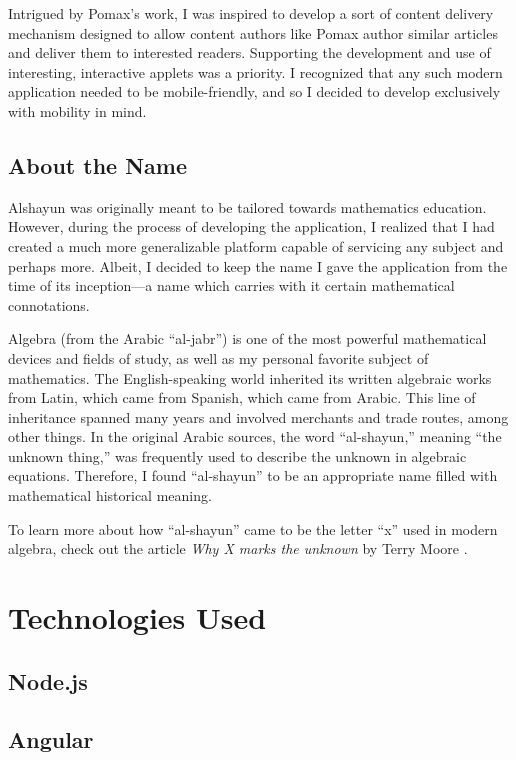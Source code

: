 \documentclass[12pt]{report}
\begin{document}
Intrigued by Pomax's work, I was inspired to develop a sort of content delivery
mechanism designed to allow content authors like Pomax author similar articles
and deliver them to interested readers. Supporting the development and use of
interesting, interactive applets was a priority. I recognized that any such
modern application needed to be mobile-friendly, and so I decided to develop
exclusively with mobility in mind.

    \section{About the Name}

Alshayun was originally meant to be tailored towards mathematics education.
However, during the process of developing the application, I realized that I had
created a much more generalizable platform capable of servicing any subject and
perhaps more. Albeit, I decided to keep the name I gave the application from the
time of its inception---a name which carries with it certain mathematical
connotations.

Algebra (from the Arabic ``al-jabr'') is one of the most powerful mathematical
devices and fields of study, as well as my personal favorite subject of
mathematics. The English-speaking world inherited its written algebraic works
from Latin, which came from Spanish, which came from Arabic. This line of
inheritance spanned many years and involved merchants and trade routes, among
other things. In the original Arabic sources, the word ``al-shayun,'' meaning
``the unknown thing,'' was frequently used to describe the unknown in algebraic
equations. Therefore, I found ``al-shayun'' to be an appropriate name filled
with mathematical historical meaning.

To learn more about how ``al-shayun'' came to be the letter ``x'' used in modern
algebra, check out the article \textit{Why X marks the unknown} by Terry Moore
\cite{moore}.

\chapter{Technologies Used}
    \section{Node.js}
    \section{Angular}
\end{document}
